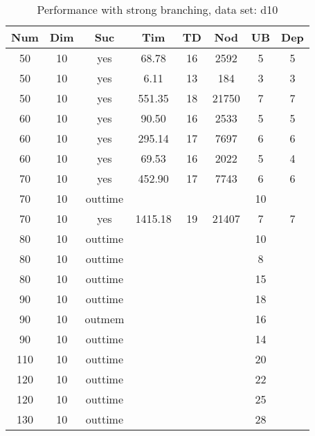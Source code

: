 \begin{table}[!htb]
  \centering
  \begin{tabular}[center]{|c|c|c|c|c|c|c|c|}
    \hline
    Num & Dim & Suc & Tim & TD & Nod & UB & Dep \\
    \hline
    50 & 10 & yes & 68.78 & 16 & 2592 & 5 & 5 \\
    50 & 10 & yes & 6.11 & 13 & 184 & 3 & 3 \\
    50 & 10 & yes & 551.35 & 18 & 21750 & 7 & 7 \\
    60 & 10 & yes & 90.50 & 16 & 2533 & 5 & 5 \\
    60 & 10 & yes & 295.14 & 17 & 7697 & 6 & 6 \\
    60 & 10 & yes & 69.53 & 16 & 2022 & 5 & 4 \\
    70 & 10 & yes & 452.90 & 17 & 7743 & 6 & 6 \\
    70 & 10 & outtime &&&& 10 &\\
    70 & 10 & yes & 1415.18 & 19 & 21407 & 7 & 7 \\
    80 & 10 & outtime &  &  &  & 10 &  \\
    80 & 10 & outtime &  &  &  & 8 &  \\
    80 & 10 & outtime &&&& 15 &\\
    90 & 10 & outtime &&&& 18 &\\
    90 & 10 & outmem &  &  &  & 16 &  \\
    90 & 10 & outtime &&&& 14 &\\
    110 & 10 & outtime &&&& 20 &\\
    120 & 10 & outtime &&&& 22 &\\
    120 & 10 & outtime &&&& 25 &\\
    130 & 10 & outtime &&&& 28 &\\
    \hline
  \end{tabular}
  \caption{Performance with strong branching, data set: d10}
  \label{tab:test.bran-d10}
\end{table}

